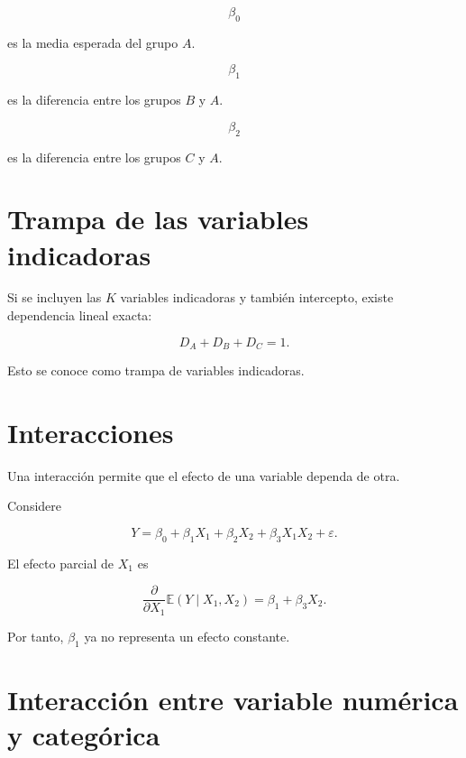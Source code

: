\documentclass[
  spanish,
  10.5pt,
  letterpaper,
  DIV=11,
  numbers=noendperiod,
  oneside,
  open=any]{scrreprt}
\theoremstyle{definition}
\theoremstyle{definition}
\theoremstyle{plain}
\theoremstyle{remark}
\begin{document}

\[
\beta_0
\]

es la media esperada del grupo \(A\).

\[
\beta_1
\]

es la diferencia entre los grupos \(B\) y \(A\).

\[
\beta_2
\]

es la diferencia entre los grupos \(C\) y \(A\).

\section*{Trampa de las variables
indicadoras}\label{trampa-de-las-variables-indicadoras}


Si se incluyen las \(K\) variables indicadoras y también intercepto,
existe dependencia lineal exacta:

\[
D_A+D_B+D_C=1.
\]

Esto se conoce como trampa de variables indicadoras.

\section*{Interacciones}\label{interacciones}


Una interacción permite que el efecto de una variable dependa de otra.

Considere

\[
Y
=
\beta_0
+
\beta_1X_1
+
\beta_2X_2
+
\beta_3X_1X_2
+
\varepsilon.
\]

El efecto parcial de \(X_1\) es

\[
\frac{\partial}{\partial X_1}
\mathbb{E}(Y\mid X_1,X_2)
=
\beta_1+\beta_3X_2.
\]

Por tanto, \(\beta_1\) ya no representa un efecto constante.

\section*{Interacción entre variable numérica y
categórica}\label{interacciuxf3n-entre-variable-numuxe9rica-y-categuxf3rica}
\end{document}
